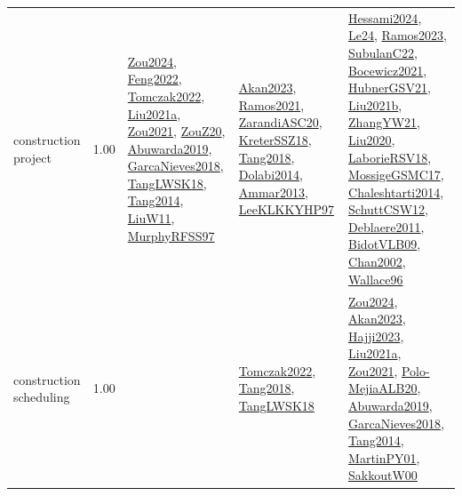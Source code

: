 {\begin{longtable}{p{3cm}r>{\raggedright\arraybackslash}p{6cm}>{\raggedright\arraybackslash}p{6cm}>{\raggedright\arraybackslash}p{8cm}}
\index{construction project}\index{ApplicationAreas!construction project}construction project &  1.00 & \hyperref[detail:Zou2024]{Zou2024}, \hyperref[detail:Feng2022]{Feng2022}, \hyperref[detail:Tomczak2022]{Tomczak2022}, \hyperref[detail:Liu2021a]{Liu2021a}, \hyperref[detail:Zou2021]{Zou2021}, \hyperref[detail:ZouZ20]{ZouZ20}, \hyperref[detail:Abuwarda2019]{Abuwarda2019}, \hyperref[detail:GarcaNieves2018]{GarcaNieves2018}, \hyperref[detail:TangLWSK18]{TangLWSK18}, \hyperref[detail:Tang2014]{Tang2014}, \hyperref[detail:LiuW11]{LiuW11}, \hyperref[detail:MurphyRFSS97]{MurphyRFSS97} & \hyperref[detail:Akan2023]{Akan2023}, \hyperref[detail:Ramos2021]{Ramos2021}, \hyperref[detail:ZarandiASC20]{ZarandiASC20}, \hyperref[detail:KreterSSZ18]{KreterSSZ18}, \hyperref[detail:Tang2018]{Tang2018}, \hyperref[detail:Dolabi2014]{Dolabi2014}, \hyperref[detail:Ammar2013]{Ammar2013}, \hyperref[detail:LeeKLKKYHP97]{LeeKLKKYHP97} & \hyperref[detail:Hessami2024]{Hessami2024}, \hyperref[detail:Le24]{Le24}, \hyperref[detail:Ramos2023]{Ramos2023}, \hyperref[detail:SubulanC22]{SubulanC22}, \hyperref[detail:Bocewicz2021]{Bocewicz2021}, \hyperref[detail:HubnerGSV21]{HubnerGSV21}, \hyperref[detail:Liu2021b]{Liu2021b}, \hyperref[detail:ZhangYW21]{ZhangYW21}, \hyperref[detail:Liu2020]{Liu2020}, \hyperref[detail:LaborieRSV18]{LaborieRSV18}, \hyperref[detail:MossigeGSMC17]{MossigeGSMC17}, \hyperref[detail:Chaleshtarti2014]{Chaleshtarti2014}, \hyperref[detail:SchuttCSW12]{SchuttCSW12}, \hyperref[detail:Deblaere2011]{Deblaere2011}, \hyperref[detail:BidotVLB09]{BidotVLB09}, \hyperref[detail:Chan2002]{Chan2002}, \hyperref[detail:Wallace96]{Wallace96}\\
\index{construction scheduling}\index{ApplicationAreas!construction scheduling}construction scheduling &  1.00 &  & \hyperref[detail:Tomczak2022]{Tomczak2022}, \hyperref[detail:Tang2018]{Tang2018}, \hyperref[detail:TangLWSK18]{TangLWSK18} & \hyperref[detail:Zou2024]{Zou2024}, \hyperref[detail:Akan2023]{Akan2023}, \hyperref[detail:Hajji2023]{Hajji2023}, \hyperref[detail:Liu2021a]{Liu2021a}, \hyperref[detail:Zou2021]{Zou2021}, \hyperref[detail:Polo-MejiaALB20]{Polo-MejiaALB20}, \hyperref[detail:Abuwarda2019]{Abuwarda2019}, \hyperref[detail:GarcaNieves2018]{GarcaNieves2018}, \hyperref[detail:Tang2014]{Tang2014}, \hyperref[detail:MartinPY01]{MartinPY01}, \hyperref[detail:SakkoutW00]{SakkoutW00}\\

\end{longtable}}
